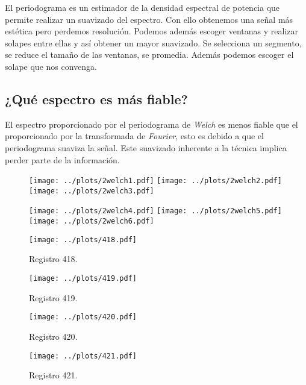\documentclass{article}
\begin{document}
El periodograma es un estimador de la densidad espectral de potencia
que permite realizar un suavizado del espectro. Con ello obtenemos una
señal más estética pero perdemos resolución. Podemos además escoger
ventanas y realizar solapes entre ellas y así obtener un mayor
suavizado. Se selecciona un segmento, se reduce el tamaño de las
ventanas, se promedia. Además podemos escoger el solape que nos
convenga.

\subsection{¿Qué espectro es más fiable?}

El espectro proporcionado por el periodograma de \textit{Welch} es
menos fiable que el proporcionado por la transformada de
\textit{Fourier}, esto es debido a que el periodograma suaviza la
señal. Este suavizado inherente a la técnica implica
perder parte de la información.

\newpage
\begin{figure}[h]
\centering
\texttt{[image: ../plots/2welch1.pdf]}
\texttt{[image: ../plots/2welch2.pdf]}
\texttt{[image: ../plots/2welch3.pdf]}
\end{figure}

\begin{figure}[h]
\centering
\texttt{[image: ../plots/2welch4.pdf]}
\texttt{[image: ../plots/2welch5.pdf]}
\texttt{[image: ../plots/2welch6.pdf]}
\end{figure}



\newpage

\begin{figure}[h]
\centering
\texttt{[image: ../plots/418.pdf]}
\caption{Registro 418.}
\end{figure}

\newpage

\begin{figure}[h]
\centering
\texttt{[image: ../plots/419.pdf]}
\caption{Registro 419.}
\end{figure}

\begin{figure}[h]
\centering
\texttt{[image: ../plots/420.pdf]}
\caption{Registro 420.}
\end{figure}

\begin{figure}[h]
\centering
\texttt{[image: ../plots/421.pdf]}
\caption{Registro 421.}
\end{figure}
\end{document}
